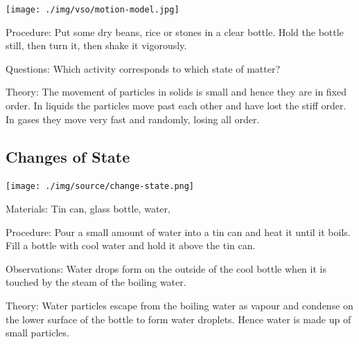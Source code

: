 \begin{multicols}{2}
\begin{center}
\texttt{[image: ./img/vso/motion-model.jpg]}
\end{center}

\begin{description*}
\item[Procedure:]{Put some dry beans, rice or stones in a clear bottle. Hold the bottle still, then turn it, then shake it vigorously.}
\item[Questions:]{Which activity corresponds to which state of matter?}
\item[Theory:]{The movement of particles in solids is small and hence they are in fixed order. In liquids the particles move past each other and have lost the stiff order. In gases they move very fast and randomly, losing all order.}
\end{description*}

\subsection{Changes of State}

\begin{center}
\texttt{[image: ./img/source/change-state.png]}
\end{center}

\begin{description*}
\item[Materials:]{Tin can, glass bottle, water, }
\item[Procedure:]{Pour a small amount of water into a tin can and heat it until it boils. Fill a bottle with cool water and hold it above the tin can.}
\item[Observations:]{Water drops form on the outside of the cool bottle when it is touched by the steam of the boiling water.}
\item[Theory:]{Water particles escape from the boiling water as vapour and condense on the lower surface of the bottle to form water droplets. Hence water is made up of small particles.}
\end{description*}


\end{multicols}
